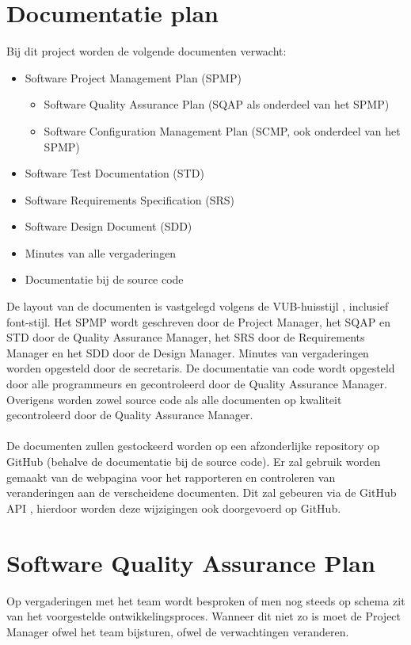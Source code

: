 \section{Documentatie plan} \label{sec:DocumentationPlan} %
Bij dit project worden de volgende documenten verwacht:
\begin{itemize}
	\item Software Project Management Plan (SPMP)
	    \begin{itemize}
	        \item Software Quality Assurance Plan (SQAP als onderdeel van het SPMP)
	        \item Software Configuration Management Plan (SCMP, ook onderdeel van het SPMP)
	    \end{itemize}
	\item Software Test Documentation (STD)
	\item Software Requirements Specification (SRS)
	\item Software Design Document (SDD)
	\item Minutes van alle vergaderingen
	\item Documentatie bij de source code
\end{itemize}
De layout van de documenten is vastgelegd volgens de VUB-huisstijl \cite{VUBHuisstijl}, inclusief font-stijl. Het SPMP wordt geschreven door de Project Manager, het SQAP en STD door de Quality Assurance Manager, het SRS door de Requirements Manager en het SDD door de Design Manager. Minutes van vergaderingen worden opgesteld door de secretaris. De documentatie van code wordt opgesteld door alle programmeurs en gecontroleerd door de Quality Assurance Manager. Overigens worden zowel source code als alle documenten op kwaliteit gecontroleerd door de Quality Assurance Manager. 
\\
\\
De documenten zullen gestockeerd worden op een afzonderlijke repository op GitHub (behalve de documentatie bij de source code). Er zal gebruik worden gemaakt van de webpagina \cite{portalWebsite} voor het rapporteren en controleren van veranderingen aan de verscheidene documenten. Dit zal gebeuren via de GitHub API \cite{GitHubAPI}, hierdoor worden deze wijzigingen ook doorgevoerd op GitHub.

\section{Software Quality Assurance Plan}
Op vergaderingen met het team wordt besproken of men nog steeds op schema zit van het voorgestelde ontwikkelingsproces. 
Wanneer dit niet zo is moet de Project Manager ofwel het team bijsturen, ofwel de verwachtingen veranderen.
\\
\\
